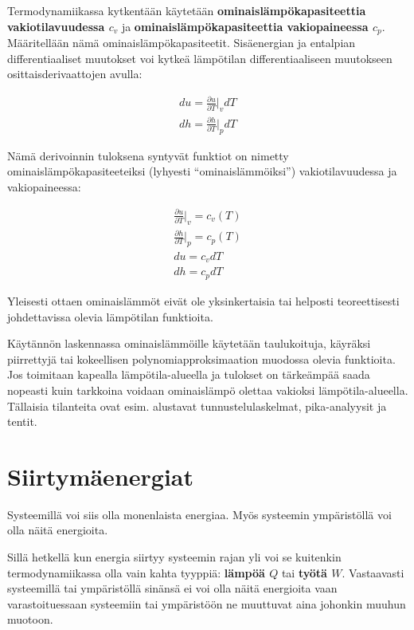 \documentclass[12pt,a4paper,finnish]{book}
\begin{document}
Termodynamiikassa kytkentään käytetään \textbf{ominaislämpökapasiteettia vakiotilavuudessa $c_v$} ja 
\textbf{ominaislämpökapasiteettia  vakiopaineessa $c_p$}. Määritellään nämä ominaislämpökapasiteetit. Sisäenergian ja 
entalpian differentiaaliset muutokset voi kytkeä lämpötilan differentiaaliseen muutokseen osittaisderivaattojen avulla:

\begin{align}
 du = \frac{\partial u}{\partial T}\bigg|_vdT\\
 dh = \frac{\partial h}{\partial T}\bigg|_pdT
\end{align}

Nämä derivoinnin tuloksena syntyvät funktiot on nimetty ominaislämpökapasiteeteiksi (lyhyesti ``ominaislämmöiksi'') 
vakiotilavuudessa ja vakiopaineessa:

\begin{align}
 \frac{\partial u}{\partial T}\bigg|_v = c_v(T)\\
 \frac{\partial h}{\partial T}\bigg|_p = c_p(T)\\
 du = c_vdT\\
 dh = c_pdT
\end{align}

Yleisesti ottaen ominaislämmöt eivät ole yksinkertaisia tai helposti teoreettisesti johdettavissa olevia lämpötilan 
funktioita. 

Käytännön laskennassa ominaislämmöille käytetään taulukoituja, käyräksi piirrettyjä tai kokeellisen 
polynomiapproksimaation muodossa olevia funktioita. Jos toimitaan kapealla lämpötila-alueella ja tulokset on 
tärkeämpää saada nopeasti kuin tarkkoina voidaan ominaislämpö olettaa vakioksi lämpötila-alueella. Tällaisia tilanteita 
ovat esim. alustavat tunnustelulaskelmat, pika-analyysit ja tentit.


\chapter{Siirtymäenergiat} %

Systeemillä voi siis olla monenlaista energiaa. Myös systeemin ympäristöllä voi olla näitä 
energioita.

Sillä hetkellä kun energia siirtyy systeemin rajan yli voi se kuitenkin termodynamiikassa 
olla vain kahta tyyppiä: \textbf{lämpöä $Q$} tai \textbf{työtä $W$}. Vastaavasti systeemillä 
tai ympäristöllä sinänsä ei voi olla näitä energioita vaan varastoituessaan systeemiin tai 
ympäristöön ne muuttuvat aina johonkin muuhun muotoon.
\end{document}
